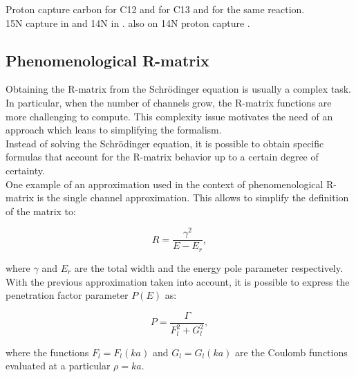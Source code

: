 \documentclass[openany]{book}
\begin{document}
Proton capture carbon \cite{burtebaev_igamov_peterson_yarmukhamedov_zazulin_2008} for C12 and \cite{chakraborty_deboer_mukherjee_roy_2015} for C13 and \cite{genard_descouvemont_terwagne_2010} for the same reaction. \\

15N capture in \cite{barker_2008} and 14N in \cite{angulo_champagne_trautvetter_2005}. also on 14N proton capture \cite{formicola_imbriani_costantini_angulo_bemmerer_bonetti_broggini_corvisiero_cruz_descouvemont_et_2004}.

\subsection{Phenomenological R-matrix} \label{sub:rmatrix_phenomenological}

Obtaining the R-matrix from the Schrödinger equation is usually a complex task. In particular, when the number of channels grow, the R-matrix functions are more challenging to compute. This complexity issue motivates the need of an approach which leans to simplifying the formalism.  \\

Instead of solving the Schrödinger equation, it is possible to obtain specific formulas that account for the R-matrix  behavior up to a certain degree of certainty.  \\

One example of an approximation used in the context of phenomenological R-matrix is the single channel approximation. This allows to simplify the definition of the matrix to: 

\begin{equation} \label{eq:rmatrix_simplified }
	R= \frac{\gamma^2}{E - E_r},
\end{equation}

where $\gamma$ and $E_r$ are the total width and the energy pole parameter respectively. \\

With the previous approximation taken into account, it is possible to express the penetration factor parameter $P(E)$ as:

\begin{equation} \label{eq:rmatrix_penetrationFactor}
	P= \frac{\Gamma}{F_l^2 + G_l^2},
\end{equation}

where the functions $F_l = F_l(ka)$ and $G_l = G_l(ka)$ are the Coulomb functions evaluated at a particular $\rho = ka$. \\
\end{document}
